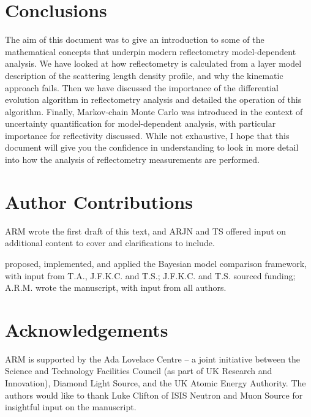 \documentclass[
 reprint,
 superscriptaddress,
 amsmath,amssymb,
 aps,
]{revtex4-1}
\begin{document}
\section{Conclusions}
The aim of this document was to give an introduction to some of the mathematical concepts that underpin modern reflectometry model-dependent analysis.
We have looked at how reflectometry is calculated from a layer model description of the scattering length density profile, and why the kinematic approach fails.
Then we have discussed the importance of the differential evolution algorithm in reflectometry analysis and detailed the operation of this algorithm.
Finally, Markov-chain Monte Carlo was introduced in the context of uncertainty quantification for model-dependent analysis, with particular importance for reflectivity discussed.
While not exhaustive, I hope that this document will give you the confidence in understanding to look in more detail into how the analysis of reflectometry measurements are performed.

\section*{Author Contributions}
ARM wrote the first draft of this text, and ARJN and TS offered input on additional content to cover and clarifications to include.


proposed, implemented, and applied the Bayesian model comparison framework, with input from T.A., J.F.K.C. and T.S.; J.F.K.C. and T.S. sourced funding; A.R.M. wrote the manuscript, with input from all authors.


\section*{Acknowledgements}
ARM is supported by the Ada Lovelace Centre -- a joint initiative between the Science and Technology Facilities Council (as part of UK Research and Innovation), Diamond Light Source, and the UK Atomic Energy Authority.
The authors would like to thank Luke Clifton of ISIS Neutron and Muon Source for insightful input on the manuscript.




\end{document}

